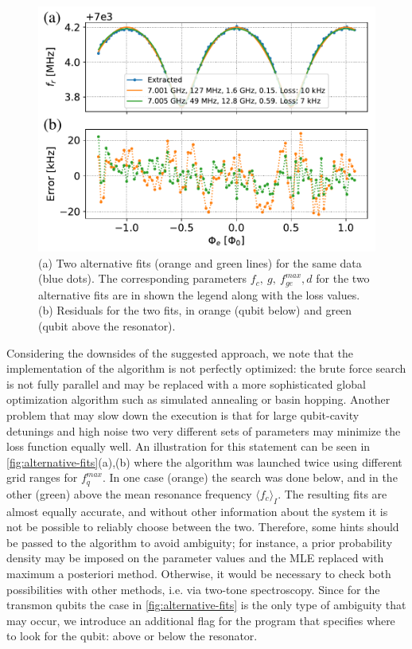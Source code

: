 \documentclass[%
 aip,
 draft,
 amsmath,amssymb,
 reprint,%
]{revtex4-1}
\begin{document}
\begin{figure}
	\centering
	\includegraphics[width=\linewidth]{alternative_fits}
	\caption{(a) Two alternative fits (orange and green lines) for the same data (blue dots). The corresponding parameters $f_c,\ g,\ f_{ge}^{max}, d$ for the two alternative fits are in shown the legend along with the loss values. (b) Residuals for the two fits, in orange (qubit below) and green (qubit above the resonator).}
	\label{fig:alternative-fits}
\end{figure}


Considering the downsides of the suggested approach, we note that the implementation of the algorithm is not perfectly optimized: the brute force search is not fully parallel and may be replaced with a more sophisticated global optimization algorithm such as simulated annealing or basin hopping. Another problem that may slow down the execution is that for large qubit-cavity detunings and high noise two very different sets of parameters may minimize the loss function equally well. An illustration for this statement can be seen in \autoref{fig:alternative-fits}(a),(b) where the algorithm was launched twice using different grid ranges for $f_q^{max}$. In one case (orange) the search was done below, and in the other (green) above the mean resonance frequency $\langle f_c\rangle_{I}$. The resulting fits are almost equally accurate, and without other information about the system it is not be possible to reliably choose between the two. Therefore, some hints should be passed to the algorithm to avoid ambiguity; for instance, a prior probability density may be imposed on the parameter values and the MLE replaced with maximum a posteriori method. Otherwise, it would be necessary to check both possibilities with other methods, i.e. via two-tone spectroscopy. Since for the transmon qubits the case in \autoref{fig:alternative-fits} is the only type of ambiguity that may occur, we introduce an additional flag for the program that specifies where to look for the qubit: above or below the resonator.
\end{document}
